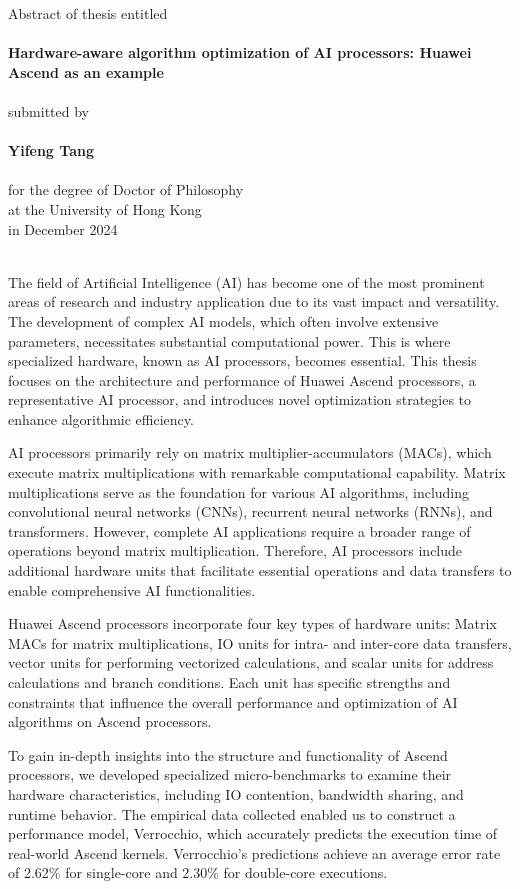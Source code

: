 \centering
Abstract of thesis entitled\\
~\\
{\Large \bf 
    Hardware-aware algorithm optimization of AI processors: Huawei Ascend as an example
}\\
~\\
submitted by\\
~\\
{\Large \bf Yifeng Tang}\\
~\\
for the degree of Doctor of Philosophy\\
at the University of Hong Kong\\
in December 2024\\
~\\
\justifying

The field of Artificial Intelligence (AI) has become one of the most prominent areas of research and industry application due to its vast impact and versatility. The development of complex AI models, which often involve extensive parameters, necessitates substantial computational power. This is where specialized hardware, known as AI processors, becomes essential. This thesis focuses on the architecture and performance of Huawei Ascend processors, a representative AI processor, and introduces novel optimization strategies to enhance algorithmic efficiency.

AI processors primarily rely on matrix multiplier-accumulators (MACs), which execute matrix multiplications with remarkable computational capability. Matrix multiplications serve as the foundation for various AI algorithms, including convolutional neural networks (CNNs), recurrent neural networks (RNNs), and transformers. However, complete AI applications require a broader range of operations beyond matrix multiplication. Therefore, AI processors include additional hardware units that facilitate essential operations and data transfers to enable comprehensive AI functionalities.

Huawei Ascend processors incorporate four key types of hardware units: Matrix MACs for matrix multiplications, IO units for intra- and inter-core data transfers, vector units for performing vectorized calculations, and scalar units for address calculations and branch conditions. Each unit has specific strengths and constraints that influence the overall performance and optimization of AI algorithms on Ascend processors.

To gain in-depth insights into the structure and functionality of Ascend processors, we developed specialized micro-benchmarks to examine their hardware characteristics, including IO contention, bandwidth sharing, and runtime behavior. The empirical data collected enabled us to construct a performance model, Verrocchio, which accurately predicts the execution time of real-world Ascend kernels. Verrocchio's predictions achieve an average error rate of 2.62\% for single-core and 2.30\% for double-core executions.

